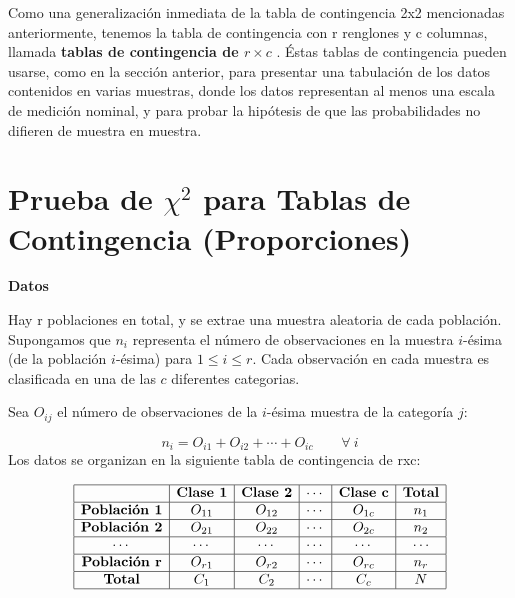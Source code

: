 \documentclass[a4paper,oneside,openany]{book}
\begin{document}
Como una generalización inmediata de la tabla de contingencia 2x2
mencionadas anteriormente, tenemos la tabla de contingencia con r
renglones y c columnas, llamada \textbf{tablas de contingencia de
\(r \times c\) }. Éstas tablas de contingencia pueden usarse, como en la
sección anterior, para presentar una tabulación de los datos contenidos
en varias muestras, donde los datos representan al menos una escala de
medición nominal, y para probar la hipótesis de que las probabilidades
no difieren de muestra en muestra.

\section{\texorpdfstring{Prueba de \(\chi^2\) para Tablas de
Contingencia
(Proporciones)}{Prueba de \textbackslash{}chi\^{}2 para Tablas de Contingencia (Proporciones)}}\label{prueba-de-chi2-para-tablas-de-contingencia-proporciones}

\textbf{Datos}

Hay r poblaciones en total, y se extrae una muestra aleatoria de cada
población. Supongamos que \(n_{i}\) representa el número de
observaciones en la muestra \(i\)-ésima (de la población \(i\)-ésima)
para \(1 \leq i \leq r\). Cada observación en cada muestra es
clasificada en una de las \(c\) diferentes categorias.

Sea \(O_{ij}\) el número de observaciones de la \(i\)-ésima muestra de
la categoría \(j\):

\[n_{i}= O_{i1}+O_{i2}+\cdots+O_{ic}\ \ \ \ \ \ \ \ \   \forall\ i\] Los
datos se organizan en la siguiente tabla de contingencia de rxc:

\[
\begin{equation*}
\begin{array}{|c|c|c|c|c|c|}
\hline
 & \textbf{Clase 1}  & \textbf{Clase 2}    & \cdots & \textbf{Clase c} &\textbf{Total}     \\
\hline
\textbf{Población 1} & O_{11} & O_{12} & \cdots & O_{1c} & n_{1}   \\
\hline
\textbf{Población 2} & O_{21} & O_{22} & \cdots & O_{2c} & n_{2}\\
\hline
\cdots    & \cdots & \cdots & \cdots & \cdots & \cdots\\
\hline
\textbf{Población r} &O_{r1} & O_{r2} & \cdots & O_{rc} & n_{r}\\
\hline
\textbf{Total}       & C_{1}  & C_{2}  & \cdots & C_{c}  & N \\
\hline
\end{array}
\end{equation*} 
\]
\end{document}
